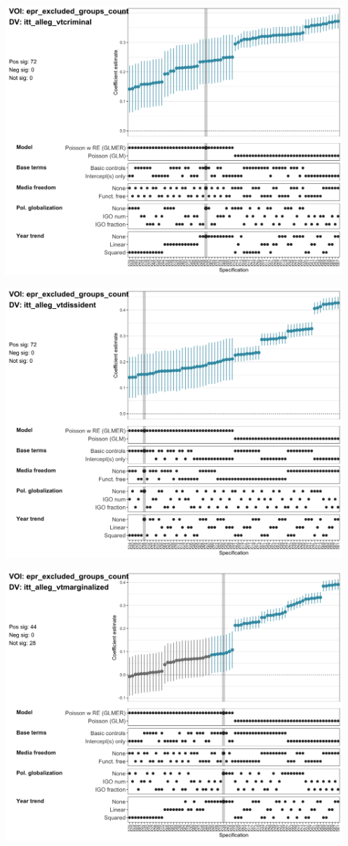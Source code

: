 \documentclass[]{article}
\begin{document}
\includegraphics[height=4in]{../output/figures-robustness/specplot-epr_excluded_groups_count-itt_alleg_vtcriminal.png}

\includegraphics[height=4in]{../output/figures-robustness/specplot-epr_excluded_groups_count-itt_alleg_vtdissident.png}

\includegraphics[height=4in]{../output/figures-robustness/specplot-epr_excluded_groups_count-itt_alleg_vtmarginalized.png}
\end{document}
